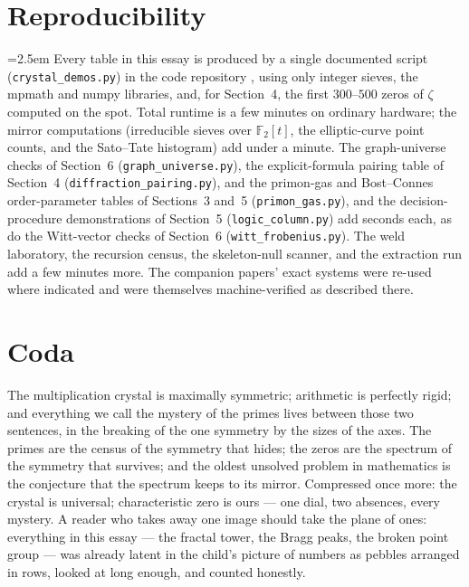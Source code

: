 \documentclass[11pt]{article}
\theoremstyle{remark}
\begin{document}
\section{Reproducibility}

{\emergencystretch=2.5em
Every table in this essay is produced by a single documented script (\texttt{crystal\_demos.py}) in
the code repository \cite{Code}, using only integer sieves, the mpmath and numpy libraries, and, for
Section~4, the first $300$--$500$ zeros of $\zeta$ computed on the spot. Total runtime is a few minutes on ordinary hardware; the mirror computations (irreducible sieves
over $\mathbb{F}_2[t]$, the elliptic-curve point counts, and the Sato--Tate histogram) add under a
minute. The graph-universe checks of Section~6 (\texttt{graph\_universe.py}), the
explicit-formula pairing table of Section~4 (\texttt{diffraction\_pairing.py}), and the
primon-gas and Bost--Connes order-parameter tables of Sections~3 and~5
(\texttt{primon\_gas.py}), and the decision-procedure demonstrations of Section~5
(\texttt{logic\_column.py}) add seconds each, as do the Witt-vector checks of Section~6
(\texttt{witt\_frobenius.py}). The weld laboratory, the recursion census, the skeleton-null scanner, and the extraction run add
a few minutes more. The companion papers' exact systems \cite{CompanionI, CompanionII,
CompanionIII} were re-used where indicated and were themselves machine-verified as described there.\par}

\section*{Coda}

The multiplication crystal is maximally symmetric; arithmetic is perfectly rigid; and everything we
call the mystery of the primes lives between those two sentences, in the breaking of the one symmetry
by the sizes of the axes. The primes are the census of the symmetry that hides; the zeros are the
spectrum of the symmetry that survives; and the oldest unsolved problem in mathematics is the
conjecture that the spectrum keeps to its mirror. Compressed once more: the
crystal is universal; characteristic zero is ours --- one dial, two absences, every mystery. A reader who takes away one image should take the
plane of ones: everything in this essay --- the fractal tower, the Bragg peaks, the broken point
group --- was already latent in the child's picture of numbers as pebbles arranged in rows, looked at
long enough, and counted honestly.
\end{document}
